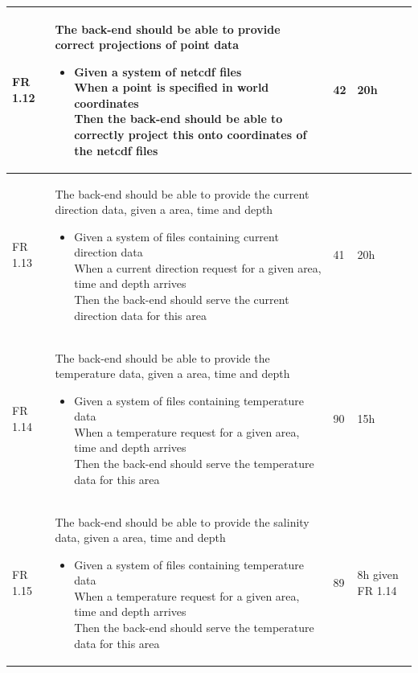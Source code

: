 \documentclass[11pt,a4paper,titlepage,oneside]{report}
\begin{document}
\begin{longtable}{p{1.4cm} p{7.8cm} p{1cm} p{1cm} }
  FR 1.12 & The back-end should be able to provide correct projections of point data
  \begin{itemize}
  \item \parbox[t]{6.8cm}{
        Given a system of \gls{netcdf} files \\
        When a point is specified in world coordinates \\
        Then the back-end should be able to correctly project this onto coordinates of the \gls{netcdf} files}
  \end{itemize}
  & 42 & 20h \\ \hline

  FR 1.13 & The back-end should be able to provide the current direction data, given a area, time and depth
  \begin{itemize}
  \item \parbox[t]{6.8cm}{
        Given a system of files containing current direction data \\
        When a current direction request for a given area, time and depth arrives \\
        Then the back-end should serve the current direction data for this area}
  \end{itemize}
  & 41 & 20h \\ \hline

  FR 1.14 & The back-end should be able to provide the temperature data, given a area, time and depth
  \begin{itemize}
  \item \parbox[t]{6.8cm}{
        Given a system of files containing temperature data \\
        When a temperature request for a given area, time and depth arrives \\
        Then the back-end should serve the temperature data for this area}
  \end{itemize}
  & 90 & 15h \\ \hline

  FR 1.15 & The back-end should be able to provide the salinity data, given a area, time and depth
  \begin{itemize}
  \item \parbox[t]{6.8cm}{
        Given a system of files containing temperature data \\
        When a temperature request for a given area, time and depth arrives \\
        Then the back-end should serve the temperature data for this area}
  \end{itemize}
  & 89 & 8h given FR 1.14 \\ \hline


\end{longtable}
\end{document}
